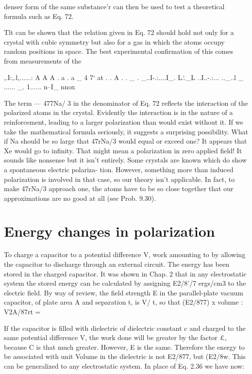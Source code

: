 {{{denser form of the same substance'r can then be used to test a theoretical
formula such as Eq. 72.

Tlt can be shown that the relation given in Eq. 72 should hold not only for a crystal
with cubic symmetry but also for a gas in which the atoms occupy random positions in
space. The best experimental confirmation of this comes from measurements of the

,.I:,.l,......: A A A . a . a _ 4 7‘ at . . A . . _ . _..I-.:....I_. L.‘._L ..I..-.:... .._..l _ ...... _. 1...... n--I_ nnox

 
 

 

 

The term  --- 477Na/ 3 in the denominator of Eq. 72 reflects the interaction
of the polarized atoms in the crystal. Evidently the interaction
is in the nature of a reinforcement, leading to a larger polarization
than would exist without it. If we take the mathematical formula
seriously, it suggests a surprising possibility. What if Na should be
so large that 47rNa/3 would equal or exceed one? It appears that
Xe would go to infinity. That might mean a polarization in zero
applied field! It sounds like nonsense but it isn't entirely. Some
crystals are known which do show a spontaneous electric polariza-
tion. However, something more than induced polarization is involved
in that case, so our theory isn't applicable. In fact, to make
47rNa/3 approach one, the atoms have to be so close together that
our approximations are no good at all (see Prob. 9.30).

\section{Energy changes in polarization}

To charge a capacitor to a potential difference V, work amounting
to %
by allowing the capacitor to discharge through an external circuit.
The energy has been stored in the charged capacitor. It was shown
in Chap. 2 that in any electrostatic system the stored energy can be
calculated by assigning E2/8'/7 ergs/cm3 to the electric field. By way
of review, the field strength E in the parallel-plate vacuum capacitor,
of plate area A and separation t, is V/ t, so that (E2/877) x volume :
V2A/87rt = %

If the capacitor is filled with dielectric of dielectric constant c and
charged to the same potential difference V, the work done will be
greater by the factor £, because C is that much greater. However,
E is the same. Therefore the energy to be associated with unit
Volume in the dielectric is not E2/877, but (E2/8w. This can be generalized
to any electrostatic system. In place of Eq. 2.36 we have now:

}}}
